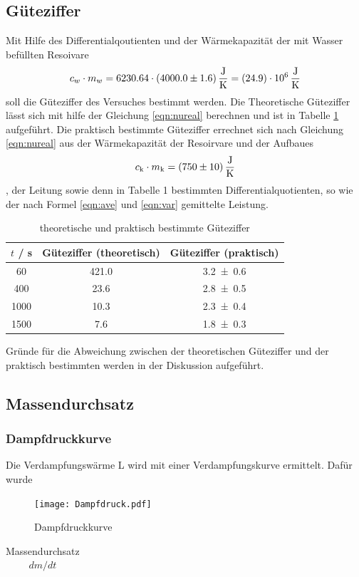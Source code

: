 \subsection{Güteziffer}
Mit Hilfe des Differentialqoutienten und der Wärmekapazität der mit Wasser befüllten Resoivare
\begin{equation}
  c_w \cdot m_w = 6230.64 \cdot (\num{4000 +- 1.6}) \, \frac{\text{J}}{\text{K}} = (\num{24.9 +- 0.0}) \cdot 10^6 \, \frac{\text{J}}{\text{K}}
  \label{eqn:WC}
\end{equation}
soll die Güteziffer des Versuches bestimmt werden. Die Theoretische Güteziffer lässt sich mit hilfe der Gleichung \ref{eqn:nureal} berechnen und ist in Tabelle \ref{tab:gueteziffer} aufgeführt. Die praktisch bestimmte Güteziffer errechnet sich nach Gleichung \ref{eqn:nureal} aus der Wärmekapazität der Resoirvare und der Aufbaues 
\begin{equation}
  c_{\text{k}} \cdot m_{\text{k}} = (\num{750 +- 10}) \, \frac{\text{J}}{\text{K}}
  \label{eqn:Res}
\end{equation}
, der Leitung sowie denn in Tabelle 1 bestimmten Differentialquotienten, so wie der nach Formel \ref{eqn:ave} und \ref{eqn:var} gemittelte Leistung.
\begin{table}
  \centering
  \begin{tabular}{c c c}
    \toprule
    $t$ / s & Güteziffer (theoretisch) & Güteziffer (praktisch) \\
    \midrule
    60	 & 421.0 & \num{3.2 +- 0.6} 	\\
    400  & 23.6	 & \num{2.8 +- 0.5} 	\\
    1000 & 10.3	 & \num{2.3 +- 0.4}	\\
    1500 & 7.6	 & \num{1.8 +- 0.3} 	\\
    \bottomrule
  \end{tabular}
  \caption{theoretische und praktisch bestimmte Güteziffer}
  \label{tab:gueteziffer}
\end{table}
Gründe für die Abweichung zwischen der theoretischen Güteziffer und der praktisch bestimmten werden in der Diskussion aufgeführt.
\subsection{Massendurchsatz}
\subsubsection{Dampfdruckkurve}
Die Verdampfungswärme L wird mit einer Verdampfungskurve ermittelt. Dafür wurde
\begin{figure}
  \centering
  \texttt{[image: Dampfdruck.pdf]}
  \caption{Dampfdruckkurve}
  \label{fig:dampfdruck}
\end{figure}

\begin{table}
  \centering
  \begin{tabular}{c c c}
    \toprule
  \end{tabular}
  \caption{Massendurchsatz $dm/dt$}
  \label{tab:dm/dt}
\end{table}
